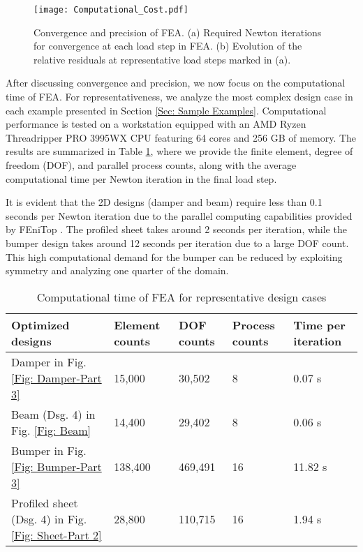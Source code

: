 \documentclass[preprint,11pt]{elsarticle}
\theoremstyle{definition}
\begin{document}
\begin{figure}[!htbp]
    \centering
    \texttt{[image: Computational\_Cost.pdf]}
    \caption{Convergence and precision of FEA. (a) Required Newton iterations for convergence at each load step in FEA. (b) Evolution of the relative residuals at representative load steps marked in (a).}
    \label{Fig: Computational Cost}
\end{figure}

After discussing convergence and precision, we now focus on the computational time of FEA. For representativeness, we analyze the most complex design case in each example presented in Section \ref{Sec: Sample Examples}. Computational performance is tested on a workstation equipped with an AMD Ryzen Threadripper PRO 3995WX CPU featuring 64 cores and 256 GB of memory. The results are summarized in Table \ref{Table: Computational Time}, where we provide the finite element, degree of freedom (DOF), and parallel process counts, along with the average computational time per Newton iteration in the final load step.

It is evident that the 2D designs (damper and beam) require less than 0.1 seconds per Newton iteration due to the parallel computing capabilities provided by FEniTop \citep{jia_fenitop_2024}. The profiled sheet takes around 2 seconds per iteration, while the bumper design takes around 12 seconds per iteration due to a large DOF count. This high computational demand for the bumper can be reduced by exploiting symmetry and analyzing one quarter of the domain.

\begin{table}[!htbp]
    \caption{Computational time of FEA for representative design cases}
    \label{Table: Computational Time}
    \centering
    \footnotesize
    \begin{tabular}{lllll}
        \hline
        \textbf{Optimized designs} & \textbf{Element counts} & \textbf{DOF counts} & \textbf{Process counts} & \textbf{Time per iteration} \\
        \hline
        Damper in Fig. \ref{Fig: Damper-Part 3} & 15,000 & 30,502 & 8 & 0.07 s\\
        Beam (Dsg. 4) in Fig. \ref{Fig: Beam} & 14,400 & 29,402 & 8 & 0.06 s\\
        Bumper in Fig. \ref{Fig: Bumper-Part 3} & 138,400 & 469,491 & 16 & 11.82 s\\
        Profiled sheet (Dsg. 4) in Fig. \ref{Fig: Sheet-Part 2} & 28,800 & 110,715 & 16 & 1.94 s\\
        \hline
    \end{tabular}
\end{table}
\end{document}
